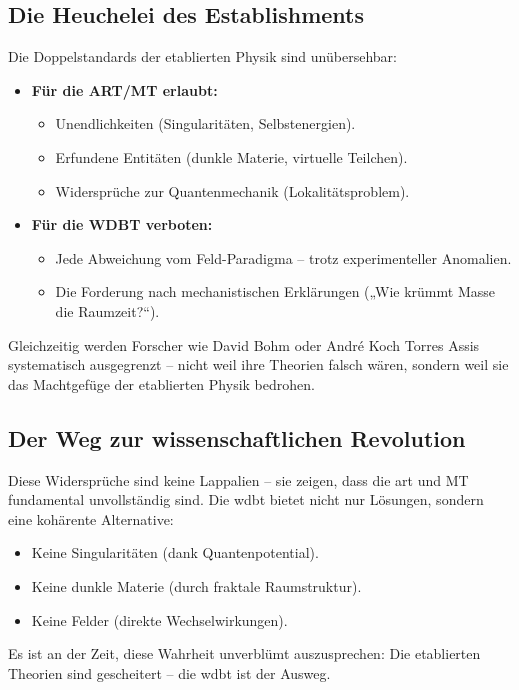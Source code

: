 \subsection{Die Heuchelei des Establishments}
Die Doppelstandards der etablierten Physik sind unübersehbar:
\begin{itemize}
    \item \textbf{Für die ART/MT erlaubt:}
    \begin{itemize}
        \item Unendlichkeiten (Singularitäten, Selbstenergien).
        \item Erfundene Entitäten (dunkle Materie, virtuelle Teilchen).
        \item Widersprüche zur Quantenmechanik (Lokalitätsproblem).
    \end{itemize}
    \item \textbf{Für die WDBT verboten:}
    \begin{itemize}
        \item Jede Abweichung vom Feld-Paradigma – trotz experimenteller Anomalien.
        \item Die Forderung nach mechanistischen Erklärungen („Wie krümmt Masse die Raumzeit?“).
    \end{itemize}
\end{itemize}
Gleichzeitig werden Forscher wie David Bohm oder André Koch Torres Assis systematisch ausgegrenzt – nicht weil ihre Theorien falsch wären, sondern weil sie das Machtgefüge der etablierten
Physik bedrohen.

\subsection{Der Weg zur wissenschaftlichen Revolution}
Diese Widersprüche sind keine Lappalien – sie zeigen, dass die \gls{art} und MT fundamental unvollständig sind. Die \gls{wdbt} bietet nicht nur Lösungen, sondern eine kohärente Alternative:
\begin{itemize}
    \item Keine Singularitäten (dank Quantenpotential).
    \item Keine dunkle Materie (durch fraktale Raumstruktur).
    \item Keine Felder (direkte Wechselwirkungen).
\end{itemize}
Es ist an der Zeit, diese Wahrheit unverblümt auszusprechen: Die etablierten Theorien sind gescheitert – die \gls{wdbt} ist der Ausweg.
